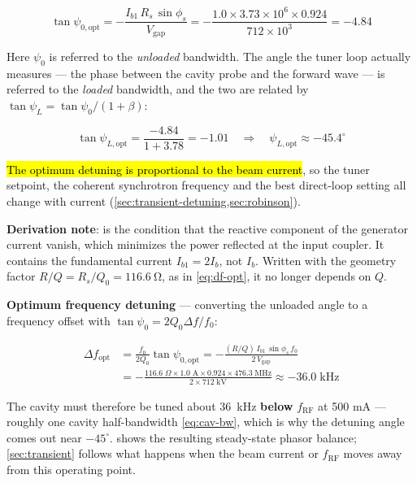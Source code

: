 \begin{equation}\label{eq:psi-opt}
\tan\psi_{0,\text{opt}} = -\frac{I_{b1}\,R_s\,\sin\phi_s}{V_\text{gap}}
  = -\frac{1.0 \times 3.73 \times 10^{6} \times 0.924}{712 \times 10^{3}} = -4.84
\end{equation}

Here \(\psi_0\) is referred to the \emph{unloaded} bandwidth. The angle the tuner loop actually measures --- the phase between the cavity probe and the forward wave --- is referred to the \emph{loaded} bandwidth, and the two are related by \(\tan\psi_L = \tan\psi_0/(1+\beta)\):

\begin{equation}\label{eq:psi-opt-eval}
\tan\psi_{L,\text{opt}} = \frac{-4.84}{1 + 3.78} = -1.01
\quad\Longrightarrow\quad
\psi_{L,\text{opt}} \approx -45.4^\circ
\end{equation}

\hl{The optimum detuning is proportional to the beam current}, so the tuner setpoint, the coherent synchrotron frequency and the best direct-loop setting all change with current (\cref{sec:transient-detuning,sec:robinson}). 

\begin{keynote}
\textbf{Derivation note}:  is the condition that the reactive component of the generator current vanish, which minimizes the power reflected at the input coupler. It contains the fundamental current \(I_{b1} = 2I_b\), not \(I_b\). Written with the geometry factor \(R/Q = R_s/Q_0 = \qty{116.6}{\ohm}\), as in \cref{eq:df-opt}, it no longer depends on \(Q\).
\end{keynote}

\textbf{Optimum frequency detuning} --- converting the unloaded angle to a frequency offset with \(\tan\psi_0 = 2Q_0\Delta f/f_0\):

\begin{equation}\label{eq:df-opt}
\begin{split}
\Delta f_\text{opt} &= \frac{f_0}{2Q_0}\tan\psi_{0,\text{opt}}
  = -\frac{(R/Q)\,I_{b1}\,\sin\phi_s\,f_0}{2\,V_\text{gap}} \\
  &= -\frac{116.6\;\Omega \times 1.0\;\text{A} \times 0.924 \times 476.3\;\text{MHz}}{2 \times 712\;\text{kV}}
  \approx -36.0\;\text{kHz}
\end{split}
\end{equation}

The cavity must therefore be tuned about \qty{36}{\kilo\hertz} \textbf{below} \(f_\text{RF}\) at 500 mA --- roughly one cavity half-bandwidth \eqref{eq:cav-bw}, which is why the detuning angle comes out near \(-45^\circ\).  shows the resulting steady-state phasor balance; \cref{sec:transient} follows what happens when the beam current or \(f_\text{RF}\) moves away from this operating point.


